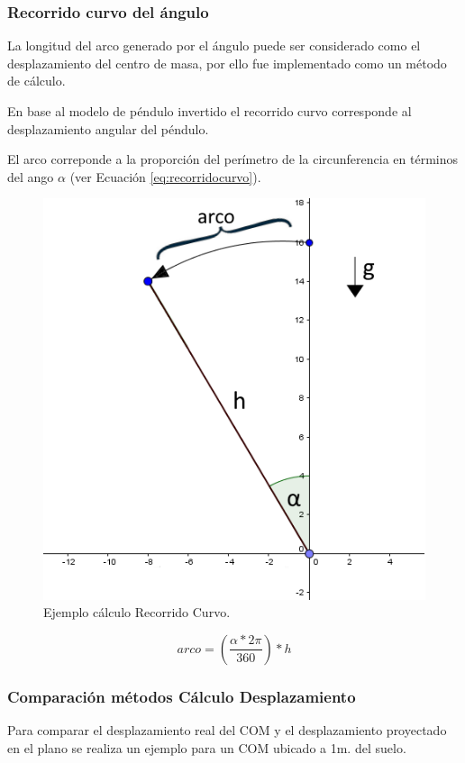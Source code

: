 \documentclass[12pt,a4paper]{article}
\begin{document}
\newpage
\subsubsection{Recorrido curvo del ángulo}
La longitud del arco generado por el ángulo puede ser considerado como el desplazamiento del centro de masa, por ello fue implementado como un método de cálculo.

En base al modelo de péndulo invertido \cite{gage_kinematic_2004} el recorrido curvo corresponde al desplazamiento angular del péndulo.

El arco correponde a la proporción del perímetro de la circunferencia en términos del ango $\alpha$ (ver Ecuación \ref{eq:recorridocurvo}).

\begin{figure}[H]
	\centering
	\includegraphics[scale=0.7]{images/calculoRecorridoCurvo}
	\caption{Ejemplo cálculo Recorrido Curvo.}
	\label{fig:recorridocurvo}
\end{figure}

\begin{equation}
	\label{eq:recorridocurvo}
	arco=\left(\frac{\alpha*2\pi}{360}\right)*h
\end{equation}

\newpage
\subsubsection{Comparación métodos Cálculo Desplazamiento}
Para comparar el desplazamiento real del COM y el desplazamiento proyectado en el plano se realiza un ejemplo para un COM ubicado a 1m. del suelo.
\end{document}
